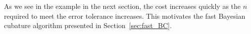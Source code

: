 \documentclass{svjour3}                     %
\begin{document}
As we see in the example in the next section, the cost increases quickly as the $n$ required to meet the error tolerance increases.  This motivates the fast Bayesian cubature algorithm presented in Section~\ref{sec:fast_BC}.
\end{document}
